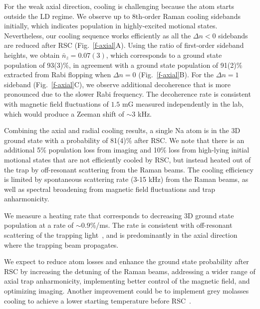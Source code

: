 \documentclass[aps,prl,twocolumn,groupedaddress]{revtex4-1}
\begin{document}
For the weak axial direction, cooling is challenging because the atom starts outside the LD regime.
We observe up to 8th-order Raman cooling sidebands initially,
which indicates population in highly-excited motional states.
Nevertheless, our cooling sequence works efficiently as all the $\Delta n<0$ sidebands are reduced
after RSC (Fig.~\ref{f-axial}A).
Using the ratio of first-order sideband heights, we obtain $\bar{n}_z=0.07(3)$, which corresponds to a ground state population of
93(3)\%, in agreement with a ground state population of 91(2)\% extracted from  Rabi flopping
when $\Delta n=0$ (Fig.~\ref{f-axial}B).
For the $\Delta n=1$ sideband (Fig.~\ref{f-axial}C),
we observe additional decoherence that is more pronounced due to the slower Rabi frequency.
The decoherence rate is consistent with magnetic field fluctuations of $1.5$ mG measured independently in the lab, which would produce a Zeeman shift of $\sim 3$ kHz.

Combining the axial and radial cooling results,
 a single Na atom is in  the 3D ground state  with a probability of 81(4)\% after RSC.
 We note that there is an additional 5\% population loss from  imaging  and 10\% loss
from  high-lying initial motional states that are not efficiently cooled by RSC,
but instead heated out of the trap by off-resonant scattering from the Raman beams.
The cooling efficiency is limited by spontaneous scattering rate (3-15 kHz) from the Raman beams, as well as spectral broadening from magnetic field fluctuations and trap anharmonicity.


We measure a heating rate that corresponds to  decreasing  3D ground state population at a rate  of  $\sim0.9$\%/ms.
The  rate is consistent with off-resonant scattering of the trapping light~\cite{Grimm2000}, and is predominantly in the axial direction where the trapping beam propagates.


We expect to reduce atom losses and enhance the ground state probability after RSC
by increasing the detuning of the Raman beams,
addressing a wider range of axial trap anharmonicity, %
implementing better control of the magnetic field, and optimizing imaging.
Another improvement could be to implement grey molasses cooling to achieve
a lower starting temperature before RSC~\cite{Colzi2016}.
\end{document}
